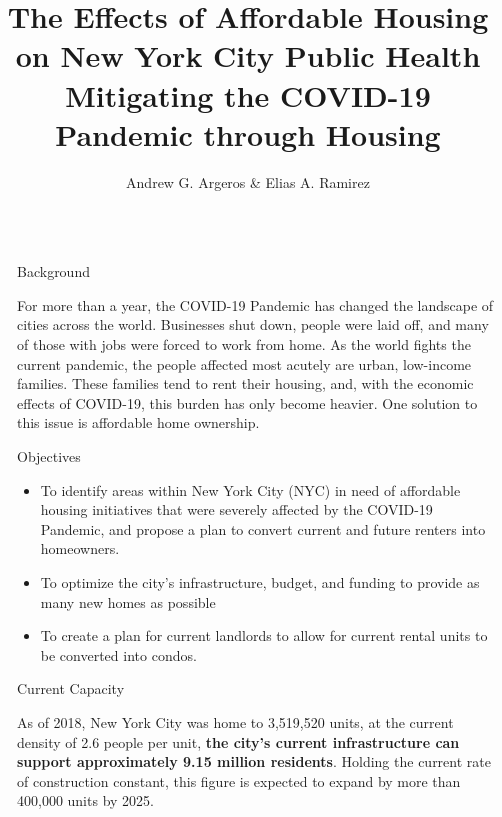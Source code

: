 \documentclass[final]{beamer}
\title{The Effects of Affordable Housing on New York City Public Health \protect\\ 
Mitigating the COVID-19 Pandemic through Housing}
\author{Andrew G. Argeros \& Elias A. Ramirez}
\institute[shortinst]{Hamline University School of Business}
\newlength{\sepwidth}
\newlength{\colwidth}
\newcommand{\separatorcolumn}{\begin{column}{\sepwidth}\end{column}}
\begin{document}

\begin{frame}[t]
\begin{columns}[t]
\separatorcolumn

\begin{column}{\colwidth}

  \begin{block}{Background}

    For more than a year, the COVID-19 Pandemic has changed the landscape of cities across the world. Businesses shut down, people were laid off, and many of those with jobs were forced to work from home. As the world fights the current pandemic, the people affected most acutely are urban, low-income families. These families tend to rent their housing, and, with the economic effects of COVID-19, this burden has only become heavier. One solution to this issue is affordable home ownership. 

  \end{block}
  
  \begin{block}{Objectives}

    \begin{itemize}
        \item To identify areas within New York City (NYC) in need of affordable housing initiatives that were severely affected by the COVID-19 Pandemic, and propose a plan to convert current and future renters into homeowners. 
        \item To optimize the city's infrastructure, budget, and funding to provide as many new homes as possible
        \item To create a plan for current landlords to allow for current rental units to be converted into condos. 
    \end{itemize}
    
  \end{block}
  
  \begin{block}{Current Capacity}

    As of 2018, New York City was home to 3,519,520 units, at the current density of 2.6 people per unit, \textbf{the city's current infrastructure can support approximately 9.15 million residents}. Holding the current rate of construction constant, this figure is expected to expand by more than 400,000 units by 2025.


\end{block}
\end{column}
\end{columns}
\end{frame}
\end{document}
